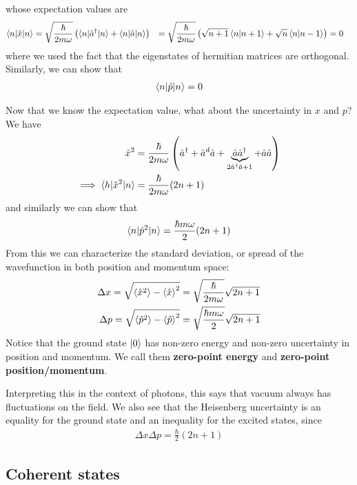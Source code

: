 whose expectation values are
\begin{align*}
		\braket{n|\hat{x}|n}
	&=
	\sqrt{\frac{\hbar}{2m \omega}} \left(
		\braket{n|\hat{a}^{\dagger}|n} + \braket{n|\hat{a}|n}
	\right)
	&=
	\sqrt{\frac{\hbar}{2m \omega}} \left(
		\sqrt{n+1}\braket{n|n+1} + \sqrt{n} \braket{n|n-1}
	\right)
	&= 0
\end{align*}
where we used the fact that the eigenstates of hermitian matrices are orthogonal. Similarly, we can show that
\begin{align*}
	\braket{n|\hat{p}|n} = 0	
\end{align*}

Now that we know the expectation value, what about the uncertainty in $x$ and $p$? We have
\begin{align*}
		\hat{x}^2 
	&= 
	\frac{\hbar}{2m \omega} \left(
			\hat{a}^{\dagger} 
		+ 
			\hat{a}^{d}\hat{a} 
		+ 
			\underbrace{
				\hat{a}\hat{a}^{\dagger}
			}_{2 \hat{a}^{\dagger}\hat{a} + 1} 
		+ 
			\hat{a}\hat{a}
	\right)
	\\
		\implies \braket{h|\hat{x}^2|n} 
	&= 
	\frac{\hbar}{2 m \omega}(2n +1)
\end{align*}
and similarly we can show that
\begin{align*}
	\braket{n|\hat{p}^{2}|n} = \frac{\hbar m \omega}{2} (2n + 1)
\end{align*}
From this we can characterize the standard deviation, or spread of the wavefunction in both position and momentum space:
\begin{align*}
	\Delta x = \sqrt{\braket{\hat{x}^2} - \braket{\hat{x}}^2} &= \sqrt{\frac{\hbar}{2m \omega}}\sqrt{2n + 1}\\
	\Delta p = \sqrt{\braket{\hat{p}^2} - \braket{\hat{p}}^2}
	&= \sqrt{\frac{\hbar m \omega}{2}}\sqrt{2n + 1}
\end{align*}
Notice that the ground state $\ket{0}$ has non-zero energy and non-zero uncertainty in position and momentum. We call them \textbf{zero-point energy} and \textbf{zero-point position/momentum}.

Interpreting this in the context of photons, this says that vacuum always has fluctuations on the field. We also see that the Heisenberg uncertainty is an equality for the ground state and an inequality for the excited states, since 
\begin{align*}
	\Delta x \Delta p = \frac{\hbar}{2}	(2n + 1)	
\end{align*}

\subsection{Coherent states}

